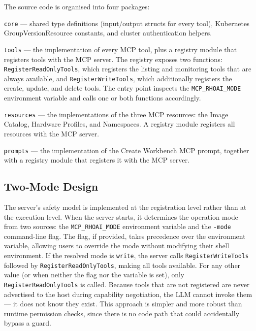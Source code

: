 \documentclass[
  digital,     %
  oneside,     %
  nosansbold,  %
  nocolorbold, %
  lof,         %
  lot,         %
]{fithesis4}
\begin{document}
The source code is organised into four packages:

\begin{compactitem}
  \item \texttt{core} --- shared type definitions (input/output structs for
        every tool), Kubernetes GroupVersionResource constants, and cluster
        authentication helpers.
  \item \texttt{tools} --- the implementation of every MCP tool, plus a
        registry module that registers tools with the MCP server. The
        registry exposes two functions:
        \texttt{RegisterReadOnlyTools}, which registers the listing and
        monitoring tools that are always available, and
        \texttt{RegisterWriteTools}, which additionally registers the
        create, update, and delete tools. The entry point inspects the
        \texttt{MCP\_RHOAI\_MODE} environment variable and calls one or both
        functions accordingly.
  \item \texttt{resources} --- the implementations of the three MCP
        resources: the Image Catalog, Hardware Profiles, and Namespaces.
        A registry module registers all resources with the MCP server.
  \item \texttt{prompts} --- the implementation of the Create Workbench
        MCP prompt, together with a registry module that registers it with
        the MCP server.
\end{compactitem}

\subsection{Two-Mode Design}
\label{subsec:two-mode}

The server's safety model is implemented at the registration level rather
than at the execution level. When the server starts, it determines the
operation mode from two sources: the \texttt{MCP\_RHOAI\_MODE} environment
variable and the \texttt{-mode} command-line flag. The flag, if provided,
takes precedence over the environment variable, allowing users to override
the mode without modifying their shell environment. If the resolved mode is
\texttt{write}, the server calls \texttt{RegisterWriteTools} followed by
\texttt{RegisterReadOnlyTools}, making all tools available. For any other
value (or when neither the flag nor the variable is set), only
\texttt{RegisterReadOnlyTools} is called. Because tools that are not
registered are never advertised to the host during capability negotiation,
the LLM cannot invoke them --- it does not know they exist. This approach is
simpler and more robust than runtime permission checks, since there is no
code path that could accidentally bypass a guard.
\end{document}
